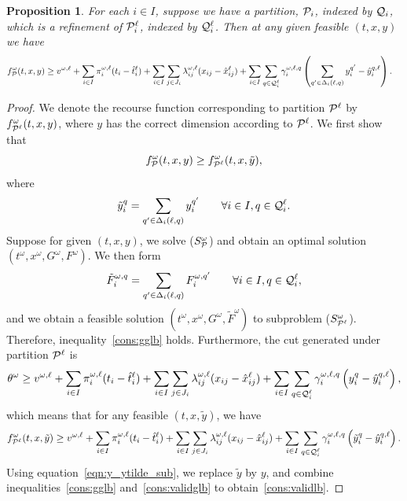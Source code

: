 \documentclass[11pt]{article}
\newtheorem{proposition}[theorem]{Proposition}
\newcommand{\cQ}{{\cal Q}}
\newcommand{\cP}{{\cal P}}
\begin{document}
	\begin{proposition} \label{prop:validity}
		For each $i \in I$, suppose we have a partition, \(\cP_i\), indexed by \(\cQ_i\), which is a refinement of \(\cP_i^\ell\), indexed by \(\cQ_i^\ell\). Then at any given feasible \((t,x,y)\) we have
{
		\begin{align} \label{cons:validlb}
			&f^\omega_{\cP}(t,x,y) \geq v^{\omega,\ell} + \sum_{i \in I} \pi_i^{\omega,\ell} (t_i - \hat{t}_i^{\ell}) + \sum_{i \in I} \sum_{j \in J_i} \lambda_{ij}^{\omega,\ell} (x_{ij} - \hat{x}_{ij}^{\ell}) + %
			\sum_{i \in I} \sum_{q \in \cQ^{\ell}_i} \gamma_{i}^{\omega,\ell,q} \left( \sum_{q^\prime \in \Delta_i(\ell,q)} y_i^{q^\prime} - \hat{y}_i^{q,\ell} \right). %
		\end{align}
}
	\end{proposition}
	\begin{proof}
		We denote the recourse function corresponding to partition \(\cP^{\ell}\) by \(f^\omega_{\cP^\ell}(t,x,y)\), where \(y\) has the correct dimension according to \(\cP^\ell\). We first show that 
		\begin{equation} \label{cons:gglb}
			f^\omega_{\cP}(t,x,y) \geq f^{\omega}_{\cP^\ell}(t,x,\tilde{y}),
		\end{equation}
		where 
		\begin{equation}\label{eqn:y_ytilde_sub}
		    \tilde{y}_i^{q} =  \sum_{q^\prime \in \Delta_i(\ell,q)} y_i^{q^\prime} \qquad  \forall i \in I, q \in \cQ^\ell_i.
		 \end{equation}
		Suppose for given \((t,x,y)\), we solve (\(S_{\cP}^\omega\)) and obtain an optimal solution \((t^{\omega},x^{\omega},G^{\omega},F^{\omega})\). We then form \[\tilde{F}^{\omega,q}_i = \sum_{q^\prime \in \Delta_i(\ell,q) }F_i^{\omega,q^\prime} \qquad  \forall i \in I, q \in \cQ^\ell_i, \]
		and we obtain a feasible solution \((t^{\omega},x^{\omega},G^{\omega},\tilde{F}^{\omega})\) to subproblem (\(S_{\cP^\ell}^\omega\)). Therefore, inequality~\eqref{cons:gglb} holds. Furthermore, the cut generated under partition \(\cP^\ell\) is
		\[\theta^\omega \geq v^{\omega,\ell} + \sum_{i \in I} \pi_i^{\omega,\ell} (t_i - \hat{t}_i^{\ell}) + \sum_{i \in I} \sum_{j \in J_i} \lambda_{ij}^{\omega,\ell} (x_{ij} - \hat{x}_{ij}^{\ell}) + \sum_{i \in I} \sum_{q \in \cQ^{\ell}_i} \gamma_{i}^{\omega,\ell,q} \left( y_i^{q} - \hat{y}_i^{q,\ell} \right),\]
		 which means that for any feasible \((t,x,\tilde{y})\), we have 
		 \begin{equation} \label{cons:validglb}
		 	f^\omega_{\cP^\ell}(t,x,\tilde{y}) \geq v^{\omega,\ell} + \sum_{i \in I} \pi_i^{\omega,\ell} (t_i - \hat{t}_i^{\ell}) + \sum_{i \in I} \sum_{j \in J_i} \lambda_{ij}^{\omega,\ell} (x_{ij} - \hat{x}_{ij}^{\ell}) + \sum_{i \in I} \sum_{q \in \cQ^{\ell}_i} \gamma_{i}^{\omega,\ell,q} \left( \tilde{y}_i^{q} - \hat{y}_i^{q,\ell} \right).
		 \end{equation}
		 Using equation~\eqref{eqn:y_ytilde_sub}, we replace \(\tilde{y}\) by \(y\), and combine inequalities~\eqref{cons:gglb} and~\eqref{cons:validglb} to obtain~\eqref{cons:validlb}.
	\end{proof}
\end{document}
